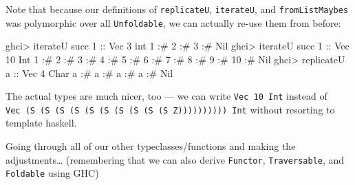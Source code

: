 \documentclass[]{article}
\newenvironment{Shaded}{}{}
\newcommand{\CharTok}[1]{\textcolor[rgb]{0.25,0.44,0.63}{#1}}
\newcommand{\DataTypeTok}[1]{\textcolor[rgb]{0.56,0.13,0.00}{#1}}
\newcommand{\DecValTok}[1]{\textcolor[rgb]{0.25,0.63,0.44}{#1}}
\newcommand{\FunctionTok}[1]{\textcolor[rgb]{0.02,0.16,0.49}{#1}}
\newcommand{\NormalTok}[1]{#1}
\newcommand{\OperatorTok}[1]{\textcolor[rgb]{0.40,0.40,0.40}{#1}}
\newcommand{\OtherTok}[1]{\textcolor[rgb]{0.00,0.44,0.13}{#1}}
\begin{document}
Note that because our definitions of \texttt{replicateU}, \texttt{iterateU}, and
\texttt{fromListMaybes} was polymorphic over all \texttt{Unfoldable}, we can
actually re-use them from before:

\begin{Shaded}
\begin{Highlighting}[]
\NormalTok{ghci}\OperatorTok{\textgreater{}}\NormalTok{ iterateU }\FunctionTok{succ} \DecValTok{1}\OtherTok{ ::} \DataTypeTok{Vec} \DecValTok{3}\NormalTok{ int}
\DecValTok{1} \OperatorTok{:\#} \DecValTok{2} \OperatorTok{:\#} \DecValTok{3} \OperatorTok{:\#} \DataTypeTok{Nil}
\NormalTok{ghci}\OperatorTok{\textgreater{}}\NormalTok{ iterateU }\FunctionTok{succ} \DecValTok{1}\OtherTok{ ::} \DataTypeTok{Vec} \DecValTok{10} \DataTypeTok{Int}
\DecValTok{1} \OperatorTok{:\#} \DecValTok{2} \OperatorTok{:\#} \DecValTok{3} \OperatorTok{:\#} \DecValTok{4} \OperatorTok{:\#} \DecValTok{5} \OperatorTok{:\#} \DecValTok{6} \OperatorTok{:\#} \DecValTok{7} \OperatorTok{:\#} \DecValTok{8} \OperatorTok{:\#} \DecValTok{9} \OperatorTok{:\#} \DecValTok{10} \OperatorTok{:\#} \DataTypeTok{Nil}
\NormalTok{ghci}\OperatorTok{\textgreater{}}\NormalTok{ replicateU }\CharTok{\textquotesingle{}a\textquotesingle{}}\OtherTok{ ::} \DataTypeTok{Vec} \DecValTok{4} \DataTypeTok{Char}
\CharTok{\textquotesingle{}a\textquotesingle{}} \OperatorTok{:\#} \CharTok{\textquotesingle{}a\textquotesingle{}} \OperatorTok{:\#} \CharTok{\textquotesingle{}a\textquotesingle{}} \OperatorTok{:\#} \CharTok{\textquotesingle{}a\textquotesingle{}} \OperatorTok{:\#} \DataTypeTok{Nil}
\end{Highlighting}
\end{Shaded}

The actual types are much nicer, too --- we can write \texttt{Vec\ 10\ Int}
instead of
\texttt{Vec\ (S\ (S\ (S\ (S\ (S\ (S\ (S\ (S\ (S\ (S\ Z))))))))))\ Int} without
resorting to template haskell.

Going through all of our other typeclasses/functions and making the
adjustments\ldots{} (remembering that we can also derive \texttt{Functor},
\texttt{Traversable}, and \texttt{Foldable} using GHC)
\end{document}

